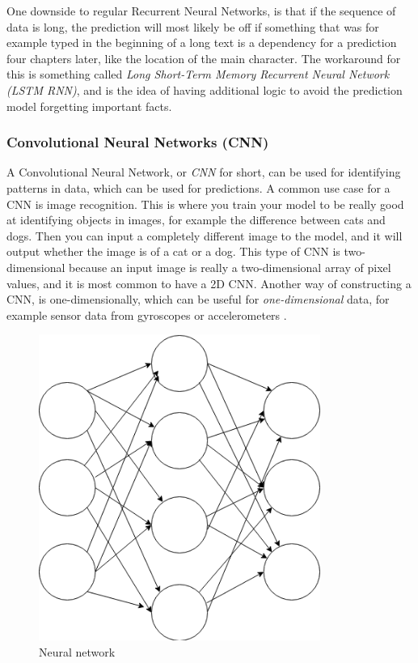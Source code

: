 One downside to regular Recurrent Neural Networks, is that if the sequence of data is long, the prediction will most likely be off if something that was for example 
typed in the beginning of a long text is a dependency for a prediction four chapters later, like the location of the main character. The workaround for this
is something called \textit{Long Short-Term Memory Recurrent Neural Network (LSTM RNN)}, and is the idea of having additional logic to avoid 
the prediction model forgetting important facts.

\subsubsection{Convolutional Neural Networks (CNN)}
A Convolutional Neural Network, or \textit{CNN} for short, can be used for identifying patterns in data, which can be used for predictions.
A common use case for a CNN is image recognition. This is where you train your model to be really good at identifying objects in images, 
for example the difference between cats and dogs. Then you can input a completely different image to the model, and it will output whether the image is of 
a cat or a dog. This type of CNN is two-dimensional because an input image is really a two-dimensional array of pixel values, and it is most common to have a 
2D CNN. Another way of constructing a CNN, is one-dimensionally, which can be useful for \textit{one-dimensional} data, for example sensor data from
gyroscopes or accelerometers \cite{1d_cnn}.

\begin{figure}
    \includegraphics[height=10cm]{neural_net.png}
    \caption{Neural network}
    \label{figure:neural_net}
\end{figure}

